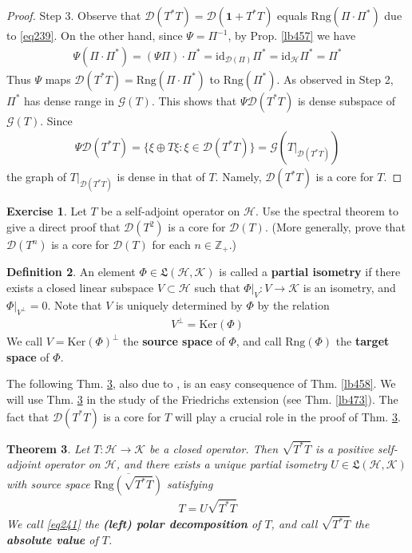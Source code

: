 \documentclass[12pt,b5paper,notitlepage]{article}
\theoremstyle{definition}
\newtheorem{df}{Definition}[subsection]
\newtheorem{exe}[df]{Exercise}
\theoremstyle{plain}
\newtheorem{thm}[df]{Theorem}
\newcommand{\fk}{\mathfrak}
\newcommand{\ovl}{\overline}
\newcommand{\idt}{\mathbf{1}}
\newcommand{\id}{\mathrm{id}}
\newcommand{\Dom}{\mathscr{D}}
\newcommand{\Zbb}{\mathbb Z}
\newcommand{\Ker}{\mathrm{Ker}}
\newcommand{\Rng}{\mathrm{Rng}}
\newcommand{\MH}{\mathcal H}
\newcommand{\MK}{\mathcal K}
\newcommand{\SG}{\mathscr G}
\numberwithin{equation}{section}
\begin{document}
\begin{proof}
Step 3. Observe that $\Dom(T^*T)=\Dom(\idt+T^*T)$ equals $\Rng(\Pi\cdot\Pi^*)$ due to \eqref{eq239}. On the other hand, since $\Psi=\Pi^{-1}$, by Prop. \ref{lb457} we have
\begin{align*}
\Psi(\Pi\cdot\Pi^*)=(\Psi\Pi)\cdot\Pi^*=\id_{\Dom(\Pi)}\Pi^*=\id_\MH\Pi^*=\Pi^*
\end{align*}
Thus $\Psi$ maps $\Dom(T^*T)=\Rng(\Pi\cdot\Pi^*)$ to $\Rng(\Pi^*)$. As observed in Step 2, $\Pi^*$ has dense range in $\SG(T)$. This shows that $\Psi\Dom(T^*T)$ is dense subspace of $\SG(T)$. Since
\begin{align*}
\Psi\Dom(T^*T)=\{\xi\oplus T\xi:\xi\in\Dom(T^*T)\}=\SG(T|_{\Dom(T^*T)})
\end{align*}
the graph of $T|_{\Dom(T^*T)}$ is dense in that of $T$. Namely, $\Dom(T^*T)$ is a core for $T$.
\end{proof}

\begin{exe}\label{lb471}
Let $T$ be a self-adjoint operator on $\MH$. Use the spectral theorem to give a direct proof that $\Dom(T^2)$ is a core for $\Dom(T)$. (More generally, prove that $\Dom(T^n)$ is a core for $\Dom(T)$ for each $n\in\Zbb_+$.)
\end{exe}



\begin{df}
An element $\Phi\in\fk L(\MH,\MK)$ is called a \textbf{partial isometry}  if there exists a closed linear subspace $V\subset\MH$ such that $\Phi|_V:V\rightarrow\MK$ is an isometry, and $\Phi|_{V^\perp}=0$. Note that $V$ is uniquely determined by $\Phi$ by the relation
\begin{align*}
V^\perp=\Ker(\Phi)
\end{align*}
We call $V=\Ker(\Phi)^\perp$ the \textbf{source space}  of $\Phi$, and call $\Rng(\Phi)$ the \textbf{target space}  of $\Phi$.
\end{df}


The following Thm. \ref{lb472}, also due to \cite{vN32b}, is an easy consequence of Thm. \ref{lb458}. We will use Thm. \ref{lb472} in the study of the Friedrichs extension (see Thm. \ref{lb473}). The fact that $\Dom(T^*T)$ is a core for $T$ will play a crucial role in the proof of Thm. \ref{lb472}.

\begin{thm}\label{lb472}
Let $T:\MH\rightarrow\MK$ be a closed operator. Then $\sqrt{T^*T}$ is a positive self-adjoint operator on $\MH$, and there exists a unique partial isometry $U\in\fk L(\MH,\MK)$ with source space $\ovl{\Rng(\sqrt{T^*T})}$ satisfying
\begin{align}\label{eq241}
T=U\sqrt{T^*T}
\end{align}
We call \eqref{eq241} the \textbf{(left) polar decomposition} of $T$,  and call $\sqrt{T^*T}$ the \textbf{absolute value}  of $T$. 
\end{thm}
\end{document}
